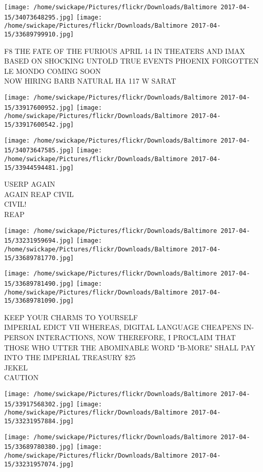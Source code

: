 \documentclass[10pt,letterpaper]{article}
\begin{document}
\texttt{[image: /home/swickape/Pictures/flickr/Downloads/Baltimore 2017-04-15/34073648295.jpg]}
\texttt{[image: /home/swickape/Pictures/flickr/Downloads/Baltimore 2017-04-15/33689799910.jpg]}

F8 THE FATE OF THE FURIOUS APRIL 14 IN THEATERS AND IMAX\\
BASED ON SHOCKING UNTOLD TRUE EVENTS PHOENIX FORGOTTEN\\
LE MONDO COMING SOON\\
NOW HIRING BARB NATURAL HA 117 W SARAT
\pagebreak

\texttt{[image: /home/swickape/Pictures/flickr/Downloads/Baltimore 2017-04-15/33917600952.jpg]}
\texttt{[image: /home/swickape/Pictures/flickr/Downloads/Baltimore 2017-04-15/33917600542.jpg]}

\texttt{[image: /home/swickape/Pictures/flickr/Downloads/Baltimore 2017-04-15/34073647585.jpg]}
\texttt{[image: /home/swickape/Pictures/flickr/Downloads/Baltimore 2017-04-15/33944594481.jpg]}

USERP AGAIN\\
AGAIN REAP CIVIL\\
CIVIL!\\
REAP
\pagebreak

\texttt{[image: /home/swickape/Pictures/flickr/Downloads/Baltimore 2017-04-15/33231959694.jpg]}
\texttt{[image: /home/swickape/Pictures/flickr/Downloads/Baltimore 2017-04-15/33689781770.jpg]}

\texttt{[image: /home/swickape/Pictures/flickr/Downloads/Baltimore 2017-04-15/33689781490.jpg]}
\texttt{[image: /home/swickape/Pictures/flickr/Downloads/Baltimore 2017-04-15/33689781090.jpg]}

KEEP YOUR CHARMS TO YOURSELF\\
IMPERIAL EDICT VII WHEREAS, DIGITAL LANGUAGE CHEAPENS IN{-}PERSON INTERACTIONS, NOW THEREFORE, I PROCLAIM THAT THOSE WHO UTTER THE ABOMINABLE WORD "B{-}MORE" SHALL PAY INTO THE IMPERIAL TREASURY \$25\\
JEKEL\\
CAUTION
\pagebreak

\texttt{[image: /home/swickape/Pictures/flickr/Downloads/Baltimore 2017-04-15/33917568302.jpg]}
\texttt{[image: /home/swickape/Pictures/flickr/Downloads/Baltimore 2017-04-15/33231957884.jpg]}

\texttt{[image: /home/swickape/Pictures/flickr/Downloads/Baltimore 2017-04-15/33689780380.jpg]}
\texttt{[image: /home/swickape/Pictures/flickr/Downloads/Baltimore 2017-04-15/33231957074.jpg]}
\end{document}
